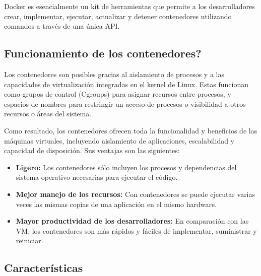 			Docker es esencialmente un kit de herramientas que permite a los desarrolladores crear, implementar, ejecutar, actualizar y detener contenedores utilizando comandos a través de una única API.
			
		\subsection{Funcionamiento de los contenedores?}
			
			Los contenedores son posibles gracias al aislamiento de procesos y a las capacidades de virtualización integradas en el kernel de Linux. Estas funcionan como grupos de control (Cgroups) para asignar recursos entre procesos, y espacios de nombres para restringir un acceso de procesos o visibilidad a otros recursos o áreas del sistema.\par
			
			Como resultado, los contenedores ofrecen toda la funcionalidad y beneficios de las máquinas virtuales, incluyendo aislamiento de aplicaciones, escalabilidad y capacidad de disposición. Sus ventajas son las siguientes:\par
			
						
			\begin{itemize}
				
				\item \textbf{Ligero:} Los contenedores sólo incluyen los procesos y dependencias del sistema operativo necesarias para ejecutar el código.
				
				\item \textbf{Mejor manejo de los recursos:} Con contenedores se puede ejecutar varias veces las mismas copias de una aplicación en el mismo hardware.
				
				\item \textbf{Mayor productividad de los desarrolladores:} En comparación con las VM, los contenedores son más rápidos y fáciles de implementar, suministrar y reiniciar.
			
			\end{itemize}
			
		\subsection{Características}
		
			\vspace{0.3cm}
				
